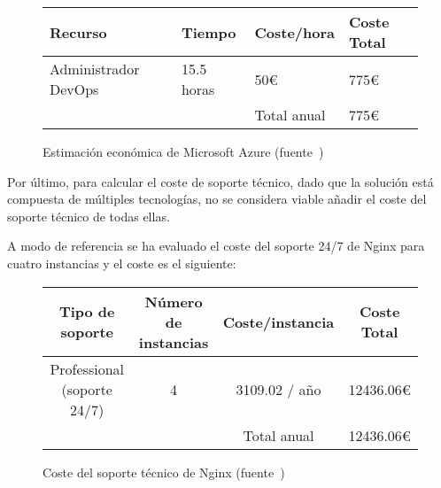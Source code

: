 \begin{figure}[!ht]
  \centering
  \begin{tabular}{|p{}|p{}|p{}|p{}|}
  \hline
  {\bf Recurso}               & {\bf Tiempo}  & {\bf Coste/hora}    & {\bf Coste Total}           \\
  \hline
    Administrador DevOps      & 15.5 horas  & 50€                 & 775€ \\
  \hline
                              &             & Total anual         & 775€ \\
  \hline
  \end{tabular}
  \label{tabla:azurecalculatorsalary}
  \caption{Estimación económica de Microsoft Azure (fuente~\cite{azurecalculator})}
\end{figure}

\par Por último, para calcular el coste de soporte técnico, dado que la solución está compuesta de múltiples tecnologías, no se considera viable añadir el coste del soporte técnico de todas ellas.
\par A modo de referencia se ha evaluado el coste del soporte 24/7 de Nginx para cuatro instancias y el coste es el siguiente:

\begin{figure}[!ht]
  \centering
  \begin{tabular}{| c | c | c | c |}
  \hline
  {\bf Tipo de soporte}           & {\bf Número de instancias}    & {\bf Coste/instancia}   & {\bf Coste Total}   \\
  \hline
    Professional (soporte 24/7)   & 4                             & 3109.02 / año           & 12436.06€           \\
  \hline
                                  &                               & Total anual             & 12436.06€           \\
  \hline
  \end{tabular}
  \label{tabla:nginxplus}
  \caption{Coste del soporte técnico de Nginx (fuente~\cite{nginxplus})}
\end{figure}

